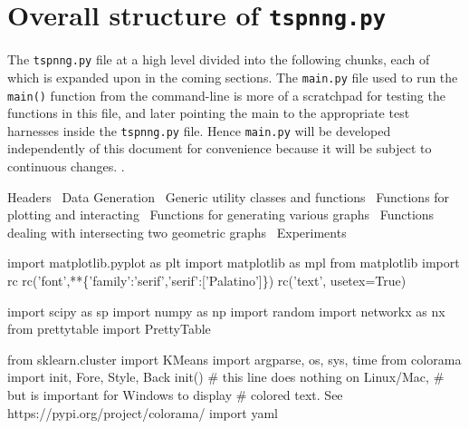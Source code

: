 \section{Overall structure of \texttt{tspnng.py}}%

The \texttt{tspnng.py} file at a high level divided into the following chunks, 
each of which is expanded upon in the coming sections. The \texttt{main.py} file used to run the \texttt{main()} function
from the command-line is more of a  scratchpad for testing the functions in this file, and later pointing the 
main to the appropriate test harnesses inside the \texttt{tspnng.py} file. Hence \texttt{main.py} will be developed 
independently of this document for convenience because it will be subject to continuous changes. .  

\nwenddocs{}\endmoddef\nwstartdeflinemarkup\nwenddeflinemarkup

\LA{}Headers~{\nwtagstyle{}}\RA{}
\LA{}Data Generation~{\nwtagstyle{}}\RA{}
\LA{}Generic utility classes and functions~{\nwtagstyle{}}\RA{}
\LA{}Functions for plotting and interacting~{\nwtagstyle{}}\RA{}
\LA{}Functions for generating various graphs~{\nwtagstyle{}}\RA{}
\LA{}Functions dealing with intersecting two geometric graphs~{\nwtagstyle{}}\RA{}
\LA{}Experiments~{\nwtagstyle{}}\RA{}
\nwendcode{}\nwdocspar


\nwenddocs{}\endmoddef\nwstartdeflinemarkup{}\nwenddeflinemarkup
import matplotlib.pyplot as plt
import matplotlib as mpl
from matplotlib import rc
rc('font',**\{'family':'serif','serif':['Palatino']\})
rc('text', usetex=True)

import scipy as sp
import numpy as np
import random
import networkx as nx
from prettytable import PrettyTable

from sklearn.cluster import KMeans
import argparse, os, sys, time
from colorama import init, Fore, Style, Back
init() # this line does nothing on Linux/Mac,
       # but is important for Windows to display
       # colored text. See https://pypi.org/project/colorama/
import yaml
\nwendcode{}\nwdocspar



